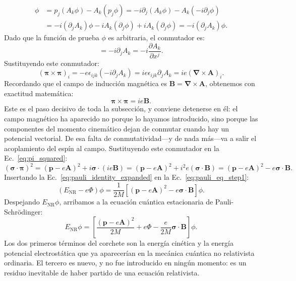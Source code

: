 \documentclass[10pt,a4paper]{article}
\begin{document}
\begin{align}
[p_j, A_k]\phi &= p_j(A_k \phi) - A_k(p_j \phi) = -i\partial_j(A_k \phi) - A_k(-i\partial_j \phi) \nonumber \\
&= -i (\partial_j A_k)\phi - i A_k (\partial_j \phi) + i A_k (\partial_j \phi) = -i (\partial_j A_k)\phi.
\end{align}
Dado que la función de prueba $\phi$ es arbitraria, el conmutador es:
\begin{equation}
[p_j, A_k] = -i \partial_j A_k = -i \frac{\partial A_k}{\partial x^j}.
\end{equation}
Sustituyendo este conmutador:
\begin{equation}
(\boldsymbol{\pi} \times \boldsymbol{\pi})_i = -e \epsilon_{ijk} (-i \partial_j A_k) = i e \epsilon_{ijk} \partial_j A_k = i e (\boldsymbol{\nabla} \times \mathbf{A})_i.
\end{equation}
Recordando que el campo de inducción magnética es $\mathbf{B} = \boldsymbol{\nabla} \times \mathbf{A}$, obtenemos con exactitud matemática:
\begin{equation}
\boldsymbol{\pi} \times \boldsymbol{\pi} = i e \mathbf{B}.
\end{equation}
Este es el paso decisivo de toda la subsección, y conviene detenerse en él: el campo magnético ha aparecido no porque lo hayamos introducido, sino porque las componentes del momento cinemático dejan de conmutar cuando hay un potencial vectorial. De esa falta de conmutatividad---y de nada más---va a salir el acoplamiento del espín al campo. Sustituyendo este conmutador en la Ec.~\eqref{eq:pi_squared}:
\begin{equation}
(\boldsymbol{\sigma} \cdot \boldsymbol{\pi})^2 = (\mathbf{p} - e\mathbf{A})^2 + i \boldsymbol{\sigma} \cdot (i e \mathbf{B}) = (\mathbf{p} - e\mathbf{A})^2 + i^2 e (\boldsymbol{\sigma} \cdot \mathbf{B}) = (\mathbf{p} - e\mathbf{A})^2 - e \boldsymbol{\sigma} \cdot \mathbf{B}.
\label{eq:pauli_identity_expanded}
\end{equation}
Insertando la Ec.~\eqref{eq:pauli_identity_expanded} en la Ec.~\eqref{eq:pauli_eq_step1}:
\begin{equation}
(E_{\text{NR}} - e\Phi)\phi = \frac{1}{2M} \left[ (\mathbf{p} - e\mathbf{A})^2 - e \boldsymbol{\sigma} \cdot \mathbf{B} \right] \phi.
\end{equation}
Despejando $E_{\text{NR}}\phi$, arribamos a la ecuación cuántica estacionaria de Pauli-Schrödinger:
\begin{equation}
E_{\text{NR}} \phi = \left[ \frac{(\mathbf{p} - e\mathbf{A})^2}{2M} + e\Phi - \frac{e}{2M} \boldsymbol{\sigma} \cdot \mathbf{B} \right] \phi.
\label{eq:pauli_schrodinger_final}
\end{equation}
Los dos primeros términos del corchete son la energía cinética y la energía potencial electrostática que ya aparecerían en la mecánica cuántica no relativista ordinaria. El tercero es nuevo, y no fue introducido en ningún momento: es un residuo inevitable de haber partido de una ecuación relativista.
\end{document}
